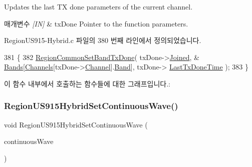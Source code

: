 Updates the last TX done parameters of the current channel. 


\begin{DoxyParams}{매개변수}
{\em \mbox{[}\+I\+N\mbox{]}} & tx\+Done Pointer to the function parameters. \\
\hline
\end{DoxyParams}


Region\+U\+S915-\/\+Hybrid.\+c 파일의 380 번째 라인에서 정의되었습니다.


\begin{DoxyCode}
381 \{
382     \mbox{\hyperlink{group___r_e_g_i_o_n_c_o_m_m_o_n_ga491dea5590228a0cd33affd71743779c}{RegionCommonSetBandTxDone}}( txDone->\mbox{\hyperlink{structs_set_band_tx_done_params_ac2f6caa0f3b02d2ac5056c3ee7c22652}{Joined}}, &
      \mbox{\hyperlink{_region_u_s915-_hybrid_8c_acdf8c87a5e1e73b468dbf151f92e2273}{Bands}}[\mbox{\hyperlink{_region_u_s915-_hybrid_8c_a2781ea69a73fdddcc54719ec4775751f}{Channels}}[txDone->\mbox{\hyperlink{structs_set_band_tx_done_params_a1ca6f01ca18afe402de51babe8c95f5e}{Channel}}].\mbox{\hyperlink{structs_channel_params_a724c03aa06953111c3291243831f251b}{Band}}], txDone->
      \mbox{\hyperlink{structs_set_band_tx_done_params_a7316dfb002c4e0015fceeb727020fe5c}{LastTxDoneTime}} );
383 \}
\end{DoxyCode}
이 함수 내부에서 호출하는 함수들에 대한 그래프입니다.\+:
\mbox{\label{group___r_e_g_i_o_n_u_s915_h_y_b_gad7b0e2c75aff473cd0c4287d4c6f24d1}} 
\subsubsection{\texorpdfstring{Region\+U\+S915\+Hybrid\+Set\+Continuous\+Wave()}{RegionUS915HybridSetContinuousWave()}}
{\footnotesize\ttfamily void Region\+U\+S915\+Hybrid\+Set\+Continuous\+Wave (\begin{DoxyParamCaption}\item[{\mbox{\hyperlink{group___r_e_g_i_o_n_gaf39bb5ba06921139c6d17f88a8d518cd}{Continuous\+Wave\+Params\+\_\+t}} $\ast$}]{continuous\+Wave }\end{DoxyParamCaption})}



